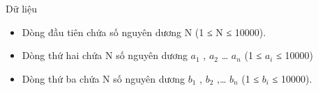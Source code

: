 Dữ liệu
\begin{itemize}
	\item     Dòng đầu tiên chứa số nguyên dương N (1 ≤ N ≤ 10000).   
	\item     Dòng thứ hai chứa N số nguyên dương $a_{1}$    , $a_{2}$    … $a_{n}$    (1 ≤ $a_{i}$    ≤ 10000)   
	\item     Dòng thứ ba chứa N số nguyên dương $b_{1}$    , $b_{2}$    ,… $b_{n}$    (1 ≤ $b_{i}$    ≤ 10000).   
\end{itemize}